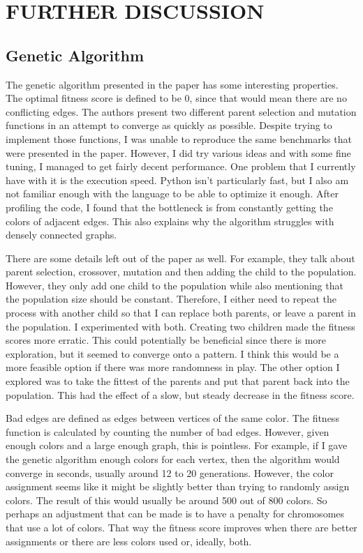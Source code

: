 \documentclass[12]{article}
\begin{document}
\section{FURTHER DISCUSSION}
\subsection{Genetic Algorithm}
The genetic algorithm presented in the paper has some interesting properties. The optimal fitness score is defined to be 0, since that would mean there are no conflicting edges.  The authors present two different parent selection and mutation functions in an attempt to converge as quickly as possible. Despite trying to implement those functions, I was unable to reproduce the same benchmarks that were presented in the paper. However, I did try various ideas and with some fine tuning, I managed to get fairly decent performance. One problem that I currently have with it is the execution speed. Python isn't particularly fast, but I also am not familiar enough with the language to be able to optimize it enough. After profiling the code, I found that the bottleneck is from constantly getting the colors of adjacent edges. This also explains why the algorithm struggles with densely connected graphs.

There are some details left out of the paper as well. For example, they talk about parent selection, crossover, mutation and then adding the child to the population. However, they only add one child to the population while also mentioning that the population size should be constant. Therefore, I either need to repeat the process with another child so that I can replace both parents, or leave a parent in the population. I experimented with both. Creating two children made the fitness scores more erratic. This could potentially be beneficial since there is more exploration, but it seemed to converge onto a pattern. I think this would be a more feasible option if there was more randomness in play. The other option I explored was to take the fittest of the parents and put that parent back into the population. This had the effect of a slow, but steady decrease in the fitness score.

Bad edges are defined as edges between vertices of the same color. The fitness function is calculated by counting the number of bad edges. However, given enough colors and a large enough graph, this is pointless. For example, if I gave the genetic algorithm enough colors for each vertex, then the algorithm would converge in seconds, usually around 12 to 20 generations. However, the color assignment seems like it might be slightly better than trying to randomly assign colors. The result of this would usually be around 500 out of 800 colors. So perhaps an adjustment that can be made is to have a penalty for chromosomes that use a lot of colors. That way the fitness score improves when there are better assignments or there are less colors used or, ideally, both.
\end{document}
